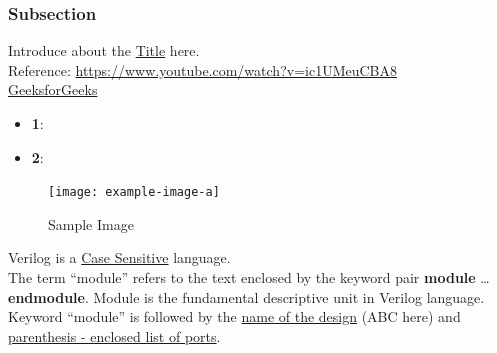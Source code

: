 \documentclass[12pt, a4paper]{article}
\begin{document}
\subsubsection{Subsection}

Introduce about the \underline{Title} here. \\

Reference: \url{https://www.youtube.com/watch?v=ic1UMeuCBA8} \\
\href{https://www.geeksforgeeks.org/difference-between-gate-level-and-structural-verilog-hdl/}{GeeksforGeeks}

\begin{itemize}
    \item \textbf{1}: 
    \item \textbf{2}:
\end{itemize}

\begin{figure}[h]   %
    \centering
    \texttt{[image: example-image-a]} %
    \caption{Sample Image}%
    \label{fig:veri1}
\end{figure}

Verilog is a \underline{Case Sensitive} language. \\
The term ``module'' refers to the text enclosed by the keyword pair \textbf{module} \ldots \textbf{endmodule}. Module is the fundamental descriptive unit in Verilog language. \\
Keyword ``module'' is followed by the \underline{name of the design} (ABC here) and \uline{parenthesis - enclosed list of ports}.\\
\end{document}

